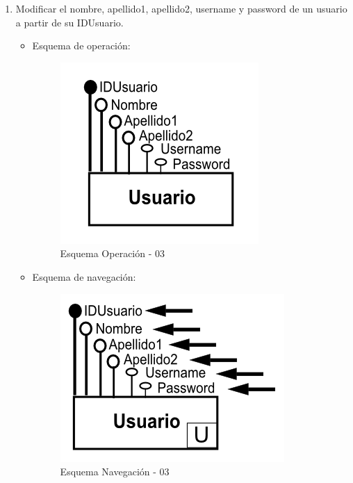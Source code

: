 \documentclass[a4paper,12pt]{report}
\begin{document}
\begin{enumerate}
\item Modificar el nombre, apellido1, apellido2, username y password
de un usuario a partir de su IDUsuario.
\begin{itemize}
\item Esquema de operación:
\begin{figure}[!htp]
\centering
\includegraphics[width=0.9\linewidth]{./operaciones/img/Usuarios/03_ope.png}
\caption{Esquema Operación - 03}
\label{fig:ope03}
\medskip
\footnotesize
{}
\end{figure}
\item Esquema de navegación:
\begin{figure}[!htp]
\centering
\includegraphics[width=0.9\linewidth]{./operaciones/img/Usuarios/03_nav.png}
\caption{Esquema Navegación - 03}
\label{fig:nave03}
\medskip
\footnotesize
{}
\end{figure}
\end{itemize}
\end{enumerate}
\end{document}
